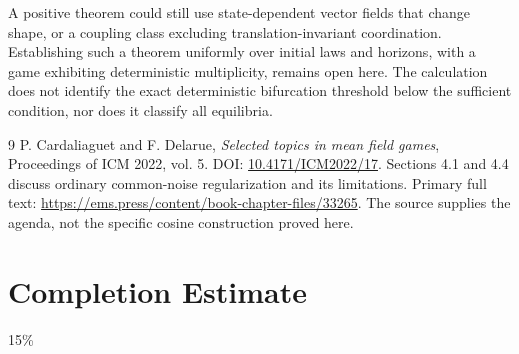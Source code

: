 \documentclass[11pt,a4paper]{article}
\theoremstyle{remark}
\begin{document}
A positive theorem could still use state-dependent vector fields that change shape, or a coupling class excluding translation-invariant coordination. Establishing such a theorem uniformly over initial laws and horizons, with a game exhibiting deterministic multiplicity, remains open here. The calculation does not identify the exact deterministic bifurcation threshold below the sufficient condition, nor does it classify all equilibria.

\begin{thebibliography}{9}
 P. Cardaliaguet and F. Delarue, \emph{Selected topics in mean field games}, Proceedings of ICM 2022, vol. 5. DOI: \href{https://doi.org/10.4171/ICM2022/17}{10.4171/ICM2022/17}. Sections 4.1 and 4.4 discuss ordinary common-noise regularization and its limitations. Primary full text: \url{https://ems.press/content/book-chapter-files/33265}. The source supplies the agenda, not the specific cosine construction proved here.
\end{thebibliography}

\section{Completion Estimate}
15\%
\end{document}
